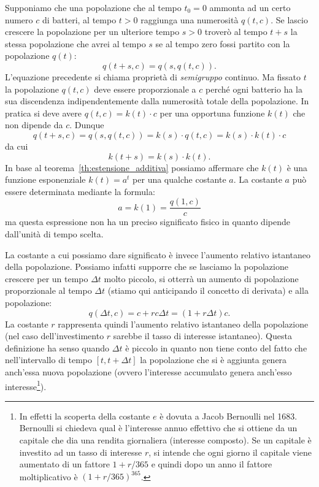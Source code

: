 Supponiamo che una popolazione che al tempo $t_0=0$
ammonta ad un certo numero $c$ di batteri, al tempo
$t>0$ raggiunga una numerosità $q(t,c)$.
Se lascio crescere la popolazione per un ulteriore
tempo $s>0$ troverò al tempo $t+s$ la stessa
popolazione che avrei al tempo $s$ se al tempo
zero fossi partito con la popolazione $q(t)$:
\[
  q(t+s,c) = q(s,q(t,c)).
\]
L'equazione precedente si chiama proprietà
di \emph{semigruppo}
%
continuo.
Ma fissato $t$ la popolazione $q(t,c)$ deve
essere proporzionale a $c$ perché ogni batterio
ha la sua discendenza indipendentemente dalla numerosità
totale della popolazione. In pratica
si deve avere $q(t,c) = k(t) \cdot c$ per una opportuna
funzione $k(t)$ che non dipende da $c$.
Dunque
\[
  q(t+s,c)
  = q(s,q(t,c))
  = k(s) \cdot q(t,c)
  = k(s) \cdot k(t) \cdot c
\]
da cui
\[
  k(t+s) = k(s) \cdot k(t).
\]
In base al teorema~\ref{th:estensione_additiva}
possiamo affermare
che $k(t)$ è una funzione esponenziale $k(t)=a^t$
per una qualche costante $a$.
La costante $a$ può essere determinata mediante la formula:
\[
  a = k(1) = \frac{q(1,c)}{c}
\]
ma questa espressione non ha un preciso significato fisico in quanto
dipende dall'unità di tempo scelta.

La costante a cui possiamo dare significato è invece l'aumento relativo
istantaneo della popolazione. Possiamo infatti supporre che
se lasciamo la popolazione crescere per un tempo $\Delta t$ molto piccolo,
si otterrà un aumento di popolazione proporzionale al tempo $\Delta t$
(stiamo qui anticipando il concetto di derivata) e alla popolazione:
\begin{equation}\label{eq:488464}
  q(\Delta t,c) = c + r c \Delta t = (1+r \Delta t) c.
\end{equation}
La costante $r$ rappresenta quindi l'aumento
relativo istantaneo della popolazione (nel caso dell'investimento
$r$ sarebbe il tasso di interesse istantaneo).
Questa definizione ha senso
quando $\Delta t$ è piccolo in quanto non tiene conto del fatto che
nell'intervallo di tempo $[t,t+\Delta t]$ la popolazione che si
è aggiunta genera anch'essa nuova popolazione (ovvero l'interesse
accumulato genera anch'esso interesse\footnote{%
In effetti la scoperta della costante $e$
è dovuta a Jacob Bernoulli nel 1683.
Bernoulli si chiedeva qual è l'interesse annuo effettivo
che si ottiene da un capitale che dia una rendita
giornaliera (interesse composto).
Se un capitale è investito ad un tasso di interesse $r$,
si intende che ogni giorno il capitale
viene aumentato di un fattore $1+r/365$
e quindi dopo un anno il fattore moltiplicativo è $(1+r/365)^{365}$.
}).

